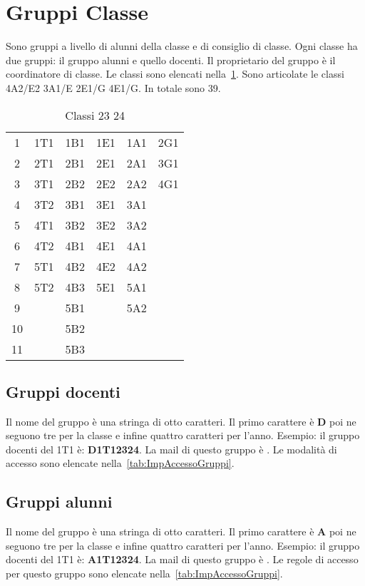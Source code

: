 \section{Gruppi Classe}
Sono gruppi a livello di alunni della classe e di consiglio di classe. Ogni classe ha due gruppi: il gruppo alunni e quello docenti. Il proprietario del gruppo è il coordinatore di classe. Le classi sono elencati nella~\cref{tab:classi2324}. Sono articolate le classi 4A2/E2 3A1/E 2E1/G 4E1/G. In totale sono 39.
\begin{table}
	\centering
	\begin{tabular}{cccccc}
\toprule
1&1T1	& 1B1 & 1E1 & 1A1 &2G1  \\
2&2T1	& 2B1 & 2E1 & 2A1 & 3G1 \\
3&3T1	&  2B2& 2E2 & 2A2 & 4G1 \\
4&3T2	&  3B1& 3E1 & 3A1 &  \\
5&4T1	&  3B2&  3E2& 3A2 &  \\
6&4T2	& 4B1 & 4E1 & 4A1 &  \\
7&5T1	& 4B2 & 4E2 & 4A2 &  \\
8&5T2	& 4B3 & 5E1 & 5A1 &  \\
9&	&  5B1&   & 5A2 & \\
10&	&  5B2&    &  \\
11&	&  5B3&         &  \\
\bottomrule
\end{tabular}
	\caption{Classi 23 24}
	\label{tab:classi2324}
\end{table}
\subsection{Gruppi docenti}
Il nome del gruppo è una stringa di otto caratteri. Il primo  carattere è \textbf{D} poi ne seguono tre  per la classe e infine quattro caratteri per l'anno.
Esempio: il gruppo docenti del 1T1 è: \textbf{D1T12324}. La mail di questo gruppo è . Le  modalità di accesso  sono elencate nella~\cref{tab:ImpAccessoGruppi}.
\subsection{Gruppi alunni}
Il nome del gruppo è una stringa di otto caratteri. Il primo  carattere è \textbf{A} poi ne seguono tre  per la classe e infine quattro caratteri per l'anno.
Esempio: il gruppo docenti del 1T1 è: \textbf{A1T12324}. La mail di questo gruppo è . Le  regole di accesso per questo gruppo sono elencate nella~\cref{tab:ImpAccessoGruppi}.
